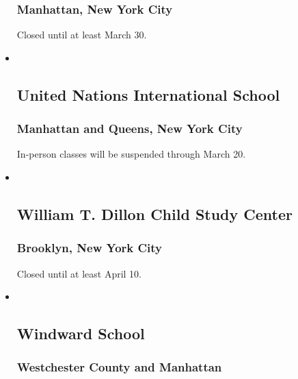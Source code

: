 \begin{itemize}
  \hypertarget{manhattan-new-york-city-16}{%
  \subsubsection{Manhattan, New York
  City}\label{manhattan-new-york-city-16}}

  Closed until at least March 30.
\item ~
  \hypertarget{united-nations-international-school}{%
  \subsection{United Nations International
  School}\label{united-nations-international-school}}

  \hypertarget{manhattan-and-queens-new-york-city}{%
  \subsubsection{Manhattan and Queens, New York
  City}\label{manhattan-and-queens-new-york-city}}

  In-person classes will be suspended through March 20.
\item ~
  \hypertarget{william-t-dillon-child-study-center}{%
  \subsection{William T. Dillon Child Study
  Center}\label{william-t-dillon-child-study-center}}

  \hypertarget{brooklyn-new-york-city-4}{%
  \subsubsection{Brooklyn, New York
  City}\label{brooklyn-new-york-city-4}}

  Closed until at least April 10.
\item ~
  \hypertarget{windward-school}{%
  \subsection{Windward School}\label{windward-school}}

  \hypertarget{westchester-county-and-manhattan}{%
  \subsubsection{Westchester County and
  Manhattan}\label{westchester-county-and-manhattan}}


\end{itemize}
